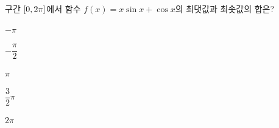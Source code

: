 구간 $[0{,}\mkern3mu\mathopen{}2\pi]$에서 함수 $f(x)=x\sin x+\cos x$의 최댓값과 최솟값의 합은?
\begin{choices32}{\rule[-3ex]{0pt}{8ex}$-\pi$}{\rule[-3ex]{0pt}{8ex}$-\dfrac{\pi}{2}$}{\rule[-3ex]{0pt}{8ex}$\pi$}{\rule[-3ex]{0pt}{8ex}$\dfrac{3}{2}\pi$}{\rule[-3ex]{0pt}{8ex}$2\pi$}\end{choices32}
